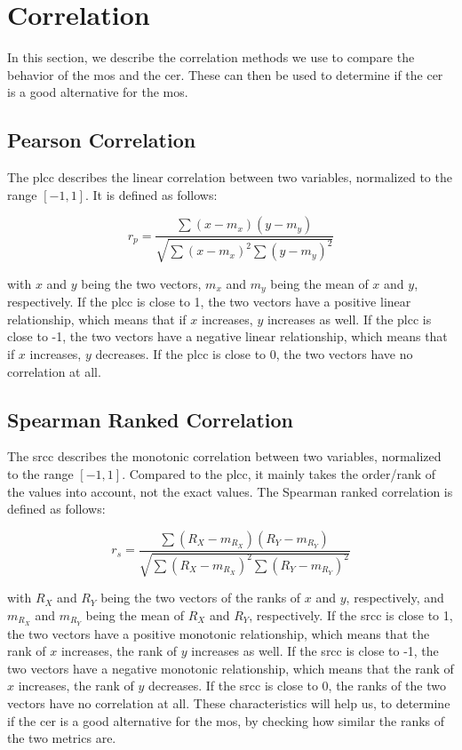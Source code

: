 \section{Correlation}
\label{sec:correlation}

In this section, we describe the correlation methods we use to compare the behavior of the \gls{mos} and the \gls{cer}.
These can then be used to determine if the \gls{cer} is a good alternative for the \gls{mos}.

\subsection{Pearson Correlation}
\label{subsec:pearson}

The \gls{plcc} \cite{pears_spear_2016} describes the linear correlation between two variables, normalized to the range \([-1, 1]\).
It is defined as follows:

\begin{equation}
    r_p = \frac{\sum{(x-m_x)(y-m_y)}}{\sqrt{\sum{(x-m_x)^2}\sum{(y-m_y)^2}}}
    \label{eq:pearson}
\end{equation}

with \(x\) and \(y\) being the two vectors, \(m_x\) and \(m_y\) being the mean of \(x\) and \(y\), respectively.
If the \gls{plcc} is close to 1, the two vectors have a positive linear relationship, which means that if \(x\) increases, \(y\) increases as well.
If the \gls{plcc} is close to -1, the two vectors have a negative linear relationship, which means that if \(x\) increases, \(y\) decreases.
If the \gls{plcc} is close to 0, the two vectors have no correlation at all.

\subsection{Spearman Ranked Correlation}
\label{subsec:spearman}

The \gls{srcc} \cite{pears_spear_2016} describes the monotonic correlation between two variables, normalized to the range \([-1, 1]\).
Compared to the \gls{plcc}, it mainly takes the order/rank of the values into account, not the exact values.
The Spearman ranked correlation is defined as follows:

\begin{equation}
    r_s = \frac{\sum{(R_X-m_{R_X})(R_Y-m_{R_Y})}}{\sqrt{\sum{(R_X-m_{R_X})^2}\sum{(R_Y-m_{R_Y})^2}}}
    \label{eq:spearman}
\end{equation}

with \(R_X\) and \(R_Y\) being the two vectors of the ranks of \(x\) and \(y\), respectively, and \(m_{R_X}\) and \(m_{R_Y}\) being the mean of \(R_X\) and \(R_Y\), respectively.
If the \gls{srcc} is close to 1, the two vectors have a positive monotonic relationship, which means that the rank of \(x\) increases, the rank of \(y\) increases as well.
If the \gls{srcc} is close to -1, the two vectors have a negative monotonic relationship, which means that the rank of \(x\) increases, the rank of \(y\) decreases.
If the \gls{srcc} is close to 0, the ranks of the two vectors have no correlation at all.
These characteristics will help us, to determine if the \gls{cer} is a good alternative for the \gls{mos}, by checking how similar the ranks of the two metrics are.
